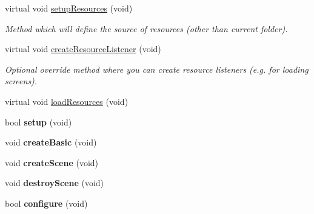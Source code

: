 \begin{DoxyCompactItemize}
\item 
\hypertarget{class_p_f_d_application_a5e0d761f30d4bc0eea0c89fad47bd119}{
virtual void \hyperlink{class_p_f_d_application_a5e0d761f30d4bc0eea0c89fad47bd119}{setupResources} (void)}
\label{class_p_f_d_application_a5e0d761f30d4bc0eea0c89fad47bd119}

\begin{DoxyCompactList}\small\item\em Method which will define the source of resources (other than current folder). \item\end{DoxyCompactList}\item 
\hypertarget{class_p_f_d_application_a9bf2c8e3ba37263e11a48c27e371f4ce}{
virtual void \hyperlink{class_p_f_d_application_a9bf2c8e3ba37263e11a48c27e371f4ce}{createResourceListener} (void)}
\label{class_p_f_d_application_a9bf2c8e3ba37263e11a48c27e371f4ce}

\begin{DoxyCompactList}\small\item\em Optional override method where you can create resource listeners (e.g. for loading screens). \item\end{DoxyCompactList}\item 
virtual void \hyperlink{class_p_f_d_application_a3f9a2a726c1e446e006cb12702431cad}{loadResources} (void)
\item 
\hypertarget{class_p_f_d_application_a3b052580c18059d7ef196328b6d65dd7}{
bool {\bfseries setup} (void)}
\label{class_p_f_d_application_a3b052580c18059d7ef196328b6d65dd7}

\item 
\hypertarget{class_p_f_d_application_a20de9f51d73442bb0dc53ac337cef416}{
void {\bfseries createBasic} (void)}
\label{class_p_f_d_application_a20de9f51d73442bb0dc53ac337cef416}

\item 
\hypertarget{class_p_f_d_application_a1c871cea5a7b054570af82ce63b0fe13}{
void {\bfseries createScene} (void)}
\label{class_p_f_d_application_a1c871cea5a7b054570af82ce63b0fe13}

\item 
\hypertarget{class_p_f_d_application_a0a42a29d9b7df78fad0a37d42ee5e461}{
void {\bfseries destroyScene} (void)}
\label{class_p_f_d_application_a0a42a29d9b7df78fad0a37d42ee5e461}

\item 
\hypertarget{class_p_f_d_application_a0a50e0bdcbd4e79d9ce7742da6b21faf}{
bool {\bfseries configure} (void)}
\label{class_p_f_d_application_a0a50e0bdcbd4e79d9ce7742da6b21faf}

\end{DoxyCompactItemize}
